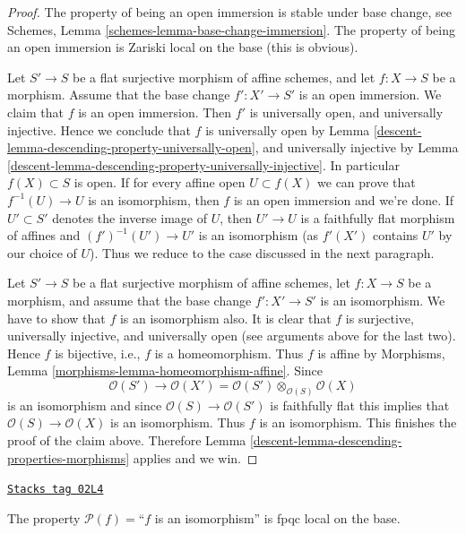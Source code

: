 \begin{proof}

The property of being an open immersion is stable under base change,
see Schemes, Lemma \ref{schemes-lemma-base-change-immersion}.
The property of being an open immersion is Zariski local on the base
(this is obvious).

\medskip\noindent
Let $S' \to S$ be a flat surjective morphism of affine schemes,
and let $f : X \to S$ be a morphism. Assume that the base change
$f' : X' \to S'$ is an open immersion. We claim that $f$ is an
open immersion.
Then $f'$ is universally open, and universally injective.
Hence we conclude that $f$ is universally open by
Lemma \ref{descent-lemma-descending-property-universally-open}, and
universally injective by
Lemma \ref{descent-lemma-descending-property-universally-injective}.
In particular $f(X) \subset S$ is open. If for every affine
open $U \subset f(X)$ we can prove that $f^{-1}(U) \to U$
is an isomorphism, then $f$ is an open immersion and we're done.
If $U' \subset S'$ denotes the inverse image of $U$,
then $U' \to U$ is a faithfully flat morphism of affines and
$(f')^{-1}(U') \to U'$ is an isomorphism (as $f'(X')$ contains $U'$
by our choice of $U$). Thus we reduce to the case discussed
in the next paragraph.

\medskip\noindent
Let $S' \to S$ be a flat surjective morphism of affine schemes,
let $f : X \to S$ be a morphism, and assume that the base change
$f' : X' \to S'$ is an isomorphism. We have to show that $f$ is an
isomorphism also. It is clear that $f$ is surjective, universally injective,
and universally open (see arguments above for the last two).
Hence $f$ is bijective, i.e., $f$ is a homeomorphism.
Thus $f$ is affine by
Morphisms, Lemma \ref{morphisms-lemma-homeomorphism-affine}.
Since
$$
\mathcal{O}(S') \to
\mathcal{O}(X') =
\mathcal{O}(S') \otimes_{\mathcal{O}(S)} \mathcal{O}(X)
$$
is an isomorphism and since $\mathcal{O}(S) \to \mathcal{O}(S')$
is faithfully flat this implies that $\mathcal{O}(S) \to \mathcal{O}(X)$
is an isomorphism. Thus $f$ is an isomorphism. This finishes the proof of
the claim above.
Therefore Lemma \ref{descent-lemma-descending-properties-morphisms} applies and we win.
\end{proof}

\begin{lemma}
\label{descent-lemma-descending-property-isomorphism}
\href{https://stacks.math.columbia.edu/tag/02L4}{\texttt{Stacks tag 02L4}}

The property $\mathcal{P}(f) =$``$f$ is an isomorphism''
is fpqc local on the base.
\end{lemma}

